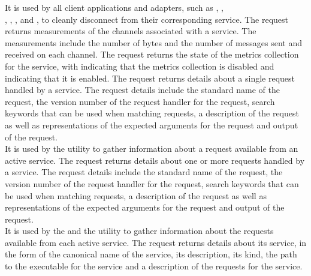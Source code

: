 It is used by all client applications and adapters, such as
,
,\\
, ,
,
 and
, to cleanly disconnect from their
corresponding service.
The  request returns measurements of the channels
associated with a service.
The measurements include the number of bytes and the number of messages sent and
received on each channel.
The  request returns the state of the metrics
collection for the service, with  indicating that the metrics collection is
disabled and  indicating that it is enabled.
The  request returns details about a single request
handled by a service.
The request details include the standard name of the request, the version number of the
request handler for the request, search keywords that can be used when matching requests,
a description of the request as well as representations of the expected arguments for the
request and output of the request.\\

It is used by the  utility to gather information about a
request available from an active service.
The  request returns details about one or more requests
handled by a service.
The request details include the standard name of the request, the version number of the
request handler for the request, search keywords that can be used when matching requests,
a description of the request as well as representations of the expected arguments for the
request and output of the request.\\

It is used by the  and the
 utility to gather information about the requests available
from each active service.
The  request returns details about its service, in the
form of the canonical name of the service, its description, its kind, the path to the
executable for the service and a description of the requests for the service.\\


